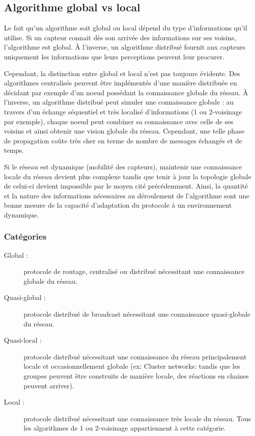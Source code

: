 \subsection{Algorithme global vs local}
Le fait qu'un algorithme soit global ou local dépend du type d'informations qu'il utilise. Si un capteur connait dès son arrivée des informations sur ses voisins, l'algorithme est global. À l'inverse, un algorithme distribué fournit aux capteurs uniquement les informations que leurs perceptions peuvent leur procurer.

Cependant, la distinction entre global et local n'est pas toujours évidente. Des algorithmes centralisés peuvent être implémentés d'une manière distribuée en décidant par exemple d'un noeud possédant la connaissance globale du réseau. À l'inverse, un algorithme distribué peut simuler une connaissance globale : au travers d'un échange séquentiel et très localisé d'informations  (1 ou 2-voisinage par exemple), chaque noeud peut combiner sa connaissance avec celle de ses voisins et ainsi obtenir une vision globale du réseau. Cependant, une telle phase de propagation coûte très cher en terme de nombre de messages échangés et de temps.

Si le réseau est dynamique (mobilité des capteurs), maintenir une connaissance locale du réseau devient plus complexe tandis que tenir à jour la topologie globale de celui-ci devient impossible par le moyen cité précédemment. Ainsi, la quantité et la nature des informations nécessaires au déroulement de l'algorithme sont une bonne mesure de la capacité d'adaptation du protocole à un environnement dynamique.   

\subsubsection{Catégories}
\begin{description}
 \item[Global :]protocole de routage, centralisé ou distribué nécessitant une connaissance globale du réseau.
 \item[Quasi-global :]protocole distribué de broadcast nécessitant une connaissance quasi-globale du réseau.
 \item[Quasi-local :]protocole distribué nécessitant une connaissance du réseau principalement locale et occasionnellement globale (ex: Cluster networks: tandis que les groupes peuvent être construits de manière locale, des réactions en chaines peuvent arriver).
 \item[Local :]protocole distribué nécessitant une connaissance très locale du réseau. Tous les algorithmes de 1 ou 2-voisinage appartiennent à cette catégorie.
\end{description}

